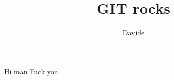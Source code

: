 \documentclass[10pt]{article}
\author{Davide}
\title{GIT rocks}
\begin{document}
	\maketitle

	Hi man
	Fuck you
\end{document}
